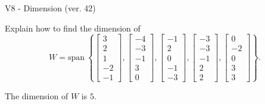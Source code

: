 \begin{exercise}
  \begin{exerciseTitle}V8 - Dimension (ver. 42)\end{exerciseTitle}
  \begin{exerciseStatement}
    Explain how to find the dimension of 
\[W=\mathrm{span}\ \left\{\left[\begin{array}{r}
3 \\
2 \\
1 \\
-2 \\
-1
\end{array}\right] , \left[\begin{array}{r}
-4 \\
-3 \\
-1 \\
3 \\
0
\end{array}\right] , \left[\begin{array}{r}
-1 \\
2 \\
0 \\
-1 \\
-3
\end{array}\right] , \left[\begin{array}{r}
-3 \\
-3 \\
-1 \\
2 \\
2
\end{array}\right] , \left[\begin{array}{r}
0 \\
-2 \\
0 \\
3 \\
3
\end{array}\right]\right\}.\]



  \end{exerciseStatement}
  \begin{exerciseAnswer}
   The dimension of \(W\) is  \(5\).
  


  \end{exerciseAnswer}
\end{exercise}